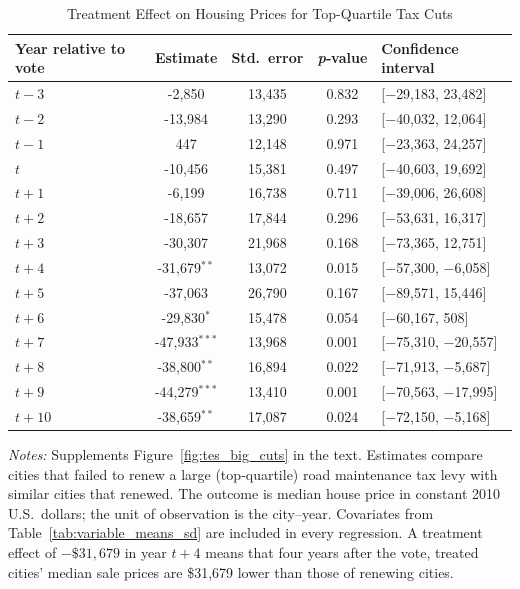 \begin{table}[htbp]
    \centering
    \caption{Treatment Effect on Housing Prices for Top-Quartile Tax Cuts}
    \label{tab:median_sale_amount_topquartile}
    \begin{threeparttable}
    \begin{minipage}{\linewidth}
    \centering
    \begin{tabular}{p{4.5cm}cccl}
        \hline
        \textbf{Year relative to vote} & \textbf{Estimate} & \textbf{Std.~error} & \textbf{\textit{p}‐value} & \textbf{Confidence interval} \\
        \hline
        $t - 3$  &  -2,850  & 13,435 & 0.832 & [$-$29,183, 23,482] \\
        $t - 2$  & -13,984  & 13,290 & 0.293 & [$-$40,032, 12,064] \\
        $t - 1$  &     447  & 12,148 & 0.971 & [$-$23,363, 24,257] \\
        $t$      & -10,456  & 15,381 & 0.497 & [$-$40,603, 19,692] \\
        $t + 1$  &  -6,199  & 16,738 & 0.711 & [$-$39,006, 26,608] \\
        $t + 2$  & -18,657  & 17,844 & 0.296 & [$-$53,631, 16,317] \\
        $t + 3$  & -30,307  & 21,968 & 0.168 & [$-$73,365, 12,751] \\
        $t + 4$  & -31,679$^{**}$  & 13,072 & 0.015 & [$-$57,300,  $-$6,058] \\
        $t + 5$  & -37,063  & 26,790 & 0.167 & [$-$89,571, 15,446] \\
        $t + 6$  & -29,830$^{*}$  & 15,478 & 0.054 & [$-$60,167,     508] \\
        $t + 7$  & -47,933$^{***}$  & 13,968 & 0.001 & [$-$75,310, $-$20,557] \\
        $t + 8$  & -38,800$^{**}$  & 16,894 & 0.022 & [$-$71,913,  $-$5,687] \\
        $t + 9$  & -44,279$^{***}$  & 13,410 & 0.001 & [$-$70,563, $-$17,995] \\
        $t + 10$ & -38,659$^{**}$  & 17,087 & 0.024 & [$-$72,150,  $-$5,168] \\
        \hline
    \end{tabular}
    \vspace{0.5em}
    \begin{tablenotes}[flushleft]
        \small
        \item \textit{Notes:} Supplements Figure~\ref{fig:tes_big_cuts} in the text. Estimates compare cities that failed to renew a large (top‐quartile) road maintenance tax levy with similar cities that renewed. The outcome is median house price in constant 2010 U.S.\ dollars; the unit of observation is the city–year. Covariates from Table~\ref{tab:variable_means_sd} are included in every regression. A treatment effect of \(-\$31{,}679\) in year \(t+4\) means that four years after the vote, treated cities’ median sale prices are \$31,679 lower than those of renewing cities.
    \end{tablenotes}
    \end{minipage}
    \end{threeparttable}
\end{table}

